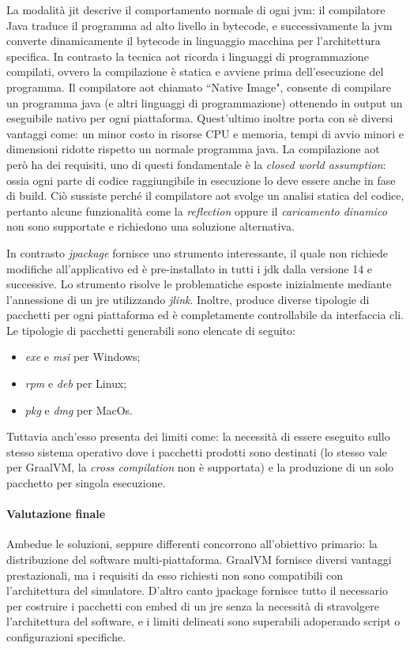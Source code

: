 La modalità \ac{jit} descrive il comportamento normale di ogni \ac{jvm}: il compilatore Java traduce il programma ad alto livello in bytecode, e successivamente la \ac{jvm} converte dinamicamente il bytecode in linguaggio macchina per l'architettura specifica. In contrasto la tecnica \ac{aot} ricorda i linguaggi di programmazione compilati, ovvero la compilazione è statica e avviene prima dell'esecuzione del programma. Il compilatore \ac{aot} chiamato ``Native Image", consente di compilare un programma java (e altri linguaggi di programmazione) ottenendo in output un eseguibile nativo per ogni piattaforma. Quest'ultimo inoltre porta con sè diversi vantaggi come: un minor costo in risorse CPU e memoria, tempi di avvio minori e dimensioni ridotte rispetto un normale programma java. La compilazione \ac{aot} però ha dei requisiti, uno di questi fondamentale è la \textit{closed world assumption}: ossia ogni parte di codice raggiungibile in esecuzione lo deve essere anche in fase di build. Ciò sussiste perché il compilatore \ac{aot} svolge un analisi statica del codice, pertanto alcune funzionalità come la \textit{reflection} oppure il \textit{caricamento dinamico} non sono supportate e richiedono una soluzione alternativa.

In contrasto \textit{jpackage} fornisce uno strumento interessante, il quale non richiede modifiche all'applicativo ed è pre-installato in tutti i \ac{jdk} dalla versione 14 e successive. Lo strumento risolve le problematiche esposte inizialmente mediante l'annessione di un \ac{jre} utilizzando \textit{jlink}. Inoltre, produce diverse tipologie di pacchetti per ogni piattaforma ed è completamente controllabile da interfaccia \ac{cli}. Le tipologie di pacchetti generabili sono elencate di seguito:
\begin{itemize}
	\item \textit{exe} e \textit{msi} per Windows;
	\item \textit{rpm} e \textit{deb} per Linux;
	\item \textit{pkg} e \textit{dmg} per MacOs.
\end{itemize}
Tuttavia anch'esso presenta dei limiti come: la necessità di essere eseguito sullo stesso sistema operativo dove i pacchetti prodotti sono destinati (lo stesso vale per GraalVM, la \textit{cross compilation} non è supportata) e la produzione di un solo pacchetto per singola esecuzione.

\paragraph{Valutazione finale} Ambedue le soluzioni, seppure differenti concorrono all'obiettivo primario: la distribuzione del software multi-piattaforma. GraalVM fornisce diversi vantaggi prestazionali, ma i requisiti da esso richiesti non sono compatibili con l'architettura del simulatore. D'altro canto jpackage fornisce tutto il necessario per costruire i pacchetti con embed di un \ac{jre} senza la necessità di stravolgere l'architettura del software, e i limiti delineati sono superabili adoperando script o configurazioni specifiche.

